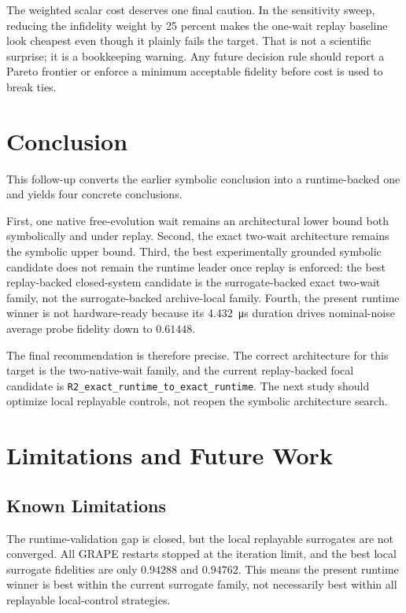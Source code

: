 \documentclass[aps,pra,twocolumn,reprint,amsmath,amssymb]{revtex4-2}
\begin{document}
The weighted scalar cost deserves one final caution. In the sensitivity sweep,
reducing the infidelity weight by 25 percent makes the one-wait replay baseline
look cheapest even though it plainly fails the target. That is not a scientific
surprise; it is a bookkeeping warning. Any future decision rule should report a
Pareto frontier or enforce a minimum acceptable fidelity before cost is used to
break ties.

\section{Conclusion}

This follow-up converts the earlier symbolic conclusion into a runtime-backed one
and yields four concrete conclusions.

First, one native free-evolution wait remains an architectural lower bound both
symbolically and under replay. Second, the exact two-wait architecture remains
the symbolic upper bound. Third, the best experimentally grounded symbolic
candidate does not remain the runtime leader once replay is enforced: the best
replay-backed closed-system candidate is the surrogate-backed exact two-wait
family, not the surrogate-backed archive-local family. Fourth, the present
runtime winner is not hardware-ready because its \SI{4.432}{\micro\second}
duration drives nominal-noise average probe fidelity down to $0.61448$.

The final recommendation is therefore precise. The correct architecture for this
target is the two-native-wait family, and the current replay-backed focal
candidate is \texttt{R2\_exact\_runtime\_to\_exact\_runtime}. The next study
should optimize local replayable controls, not reopen the symbolic architecture
search.

\section{Limitations and Future Work}

\subsection{Known Limitations}

The runtime-validation gap is closed, but the local replayable surrogates are not
converged. All GRAPE restarts stopped at the iteration limit, and the best local
surrogate fidelities are only $0.94288$ and $0.94762$. This means the present
runtime winner is best within the current surrogate family, not necessarily best
within all replayable local-control strategies.
\end{document}
